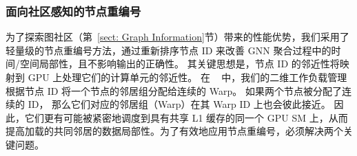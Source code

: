 \subsubsection{面向社区感知的节点重编号}
\label{sect: Node Renumbering}

为了探索图社区（第~\ref{sect: Graph Information}节）带来的性能优势，我们采用了轻量级的节点重编号方法，通过重新排序节点 ID 来改善 GNN 聚合过程中的时间/空间局部性，且不影响输出的正确性。
其关键思想是，节点 ID 的邻近性将映射到 GPU 上处理它们的计算单元的邻近性。
在 ~\Mname{} 中，我们的二维工作负载管理根据节点 ID 将一个节点的邻居组分配给连续的 Warp。
如果两个节点被分配了连续的 ID，
那么它们对应的邻居组（Warp）在其 Warp ID 上也会彼此接近。
因此，它们更有可能被紧密地调度到具有共享 L1 缓存的同一个 GPU SM 上，从而提高加载的共同邻居的数据局部性。为了有效地应用节点重编号，必须解决两个关键问题。

